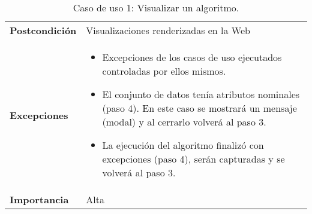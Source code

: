 \begin{table}[p]
\begin{tabularx}{\linewidth}{ p{} p{} }
		\textbf{Postcondición}        & Visualizaciones renderizadas en la Web \\
		\textbf{Excepciones}          & \begin{itemize}
			\item Excepciones de los casos de uso ejecutados controladas por ellos mismos.
			\item El conjunto de datos tenía atributos nominales (paso 4). En este caso se mostrará un mensaje (modal) y al cerrarlo volverá al paso 3.
			\item La ejecución del algoritmo finalizó con excepciones (paso 4), serán capturadas y se volverá al paso 3.
		\end{itemize}	 \\
		\textbf{Importancia}          & Alta\\
		\bottomrule
	\end{tabularx}
	\caption{Caso de uso 1: Visualizar un algoritmo.}
\end{table}



